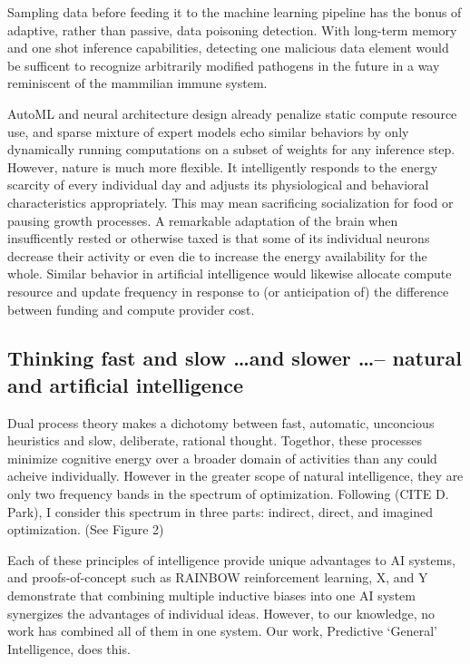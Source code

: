 Sampling data before feeding it to the machine learning pipeline has the bonus of adaptive, rather than passive, data poisoning detection. With long-term memory and one shot inference capabilities, detecting one malicious data element would be sufficent to recognize arbitrarily modified pathogens in the future in a way reminiscent of the mammilian immune system.

AutoML and neural architecture design already penalize static compute resource use, and sparse mixture of expert models echo similar behaviors by only dynamically running computations on a subset of weights for any inference step. However, nature is much more flexible. It intelligently responds to the energy scarcity of every individual day and adjusts its physiological and behavioral characteristics appropriately. This may mean sacrificing socialization for food or pausing growth processes. A remarkable adaptation of the brain when insufficently rested or otherwise taxed is that some of its individual neurons decrease their activity or even die to increase the energy availability for the whole. Similar behavior in artificial intelligence would likewise allocate compute resource and update frequency in response to (or anticipation of) the difference between funding and compute provider cost.
    
\subsection{Thinking fast and slow \dots and slower \dots -- natural and artificial intelligence}

Dual process theory makes a dichotomy between fast, automatic, unconcious heuristics and slow, deliberate, rational thought. Togethor, these processes minimize cognitive energy over a broader domain of activities than any could acheive individually. However in the greater scope of natural intelligence, they are only two frequency bands in the spectrum of optimization. Following (CITE D. Park), I consider this spectrum in three parts: indirect, direct, and imagined optimization. (See Figure 2)




    
Each of these principles of intelligence provide unique advantages to AI systems, and proofs-of-concept such as RAINBOW reinforcement learning, X, and Y demonstrate that combining multiple inductive biases into one AI system synergizes the advantages of individual ideas. However, to our knowledge, no work has combined all of them in one system. Our work, Predictive ‘General’ Intelligence, does this. 

